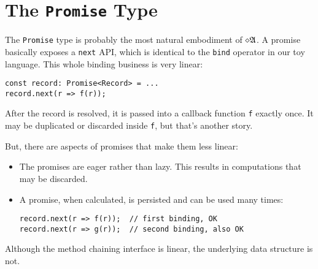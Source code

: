 \section{The \texttt{Promise} Type}

The \texttt{Promise} type is probably the most natural embodiment of $\diamond\mathfrak{A}$. A promise basically exposes a \texttt{next} API, which is identical to the \texttt{bind} operator in our toy language. This whole binding business is very linear:

\begin{verbatim}
const record: Promise<Record> = ...
record.next(r => f(r));
\end{verbatim}

After the record is resolved, it is passed into a callback function \texttt{f} exactly once. It may be duplicated or discarded inside \texttt{f}, but that's another story.

But, there are aspects of promises that make them less linear:
\begin{itemize}
    \item The promises are eager rather than lazy. This results in computations that may be discarded.
    \item A promise, when calculated, is persisted and can be used many times:
    
\begin{verbatim}
record.next(r => f(r));  // first binding, OK
record.next(r => g(r));  // second binding, also OK
\end{verbatim}
\end{itemize}

Although the method chaining interface is linear, the underlying data structure is not.